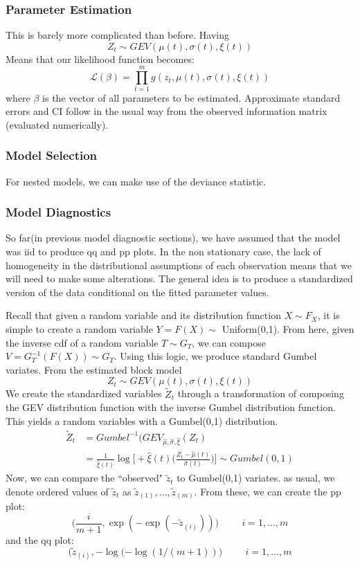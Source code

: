 \documentclass{article}
\theoremstyle{definition}
\theoremstyle{definition}
\begin{document}
\subsubsection{Parameter Estimation}
This is barely more complicated than before. Having 
\[Z_t \sim GEV(\mu(t), \sigma(t), \xi(t))\]
Means that our likelihood function becomes:
\[\mathcal{L}(\beta)= \prod_{t=1}^{m} g(z_t, \mu(t), \sigma(t), \xi(t))\]
where $\beta$ is the vector of all parameters to be
estimated. Approximate standard errors and CI
follow in the usual way from the observed information matrix (evaluated numerically).

\subsubsection{Model Selection}
For nested models, we can make use of the deviance statistic.

\subsubsection{Model Diagnostics}
So far(in previous model diagnostic sections), we have assumed that the model was iid to produce qq and pp plots. In the non stationary case, the lack of homogeneity in the distributional assumptions of each observation means that we will need to make some alterations. The general idea is to produce a standardized version of the data conditional on the fitted parameter values. 

Recall that given a random variable and its distribution function $X\sim F_X$, it is simple to create a random variable $Y=F(X)\sim$ Uniform(0,1). From here, given the inverse cdf of a random variable $T \sim G_T$, we can compose $V=G_T^{-1}(F(X))\sim G_T$. Using this logic, we produce standard Gumbel variates. From the estimated block model  
\[Z_t \sim GEV(\mu(t), \sigma(t), \xi(t))\]
We create the standardized variables $\tilde{Z}_t$ through a transformation of composing the GEV distribution function with the inverse Gumbel distribution function. This yields a random variables with a Gumbel(0,1) distribution.
\begin{align*}
    \tilde{Z}_t&= Gumbel^{-1}(GEV_{\hat\mu,\hat\sigma,\hat\xi}(Z_t)\\
    &= \frac{1}{\hat\xi(t)}\log\bigg[ +\hat\xi(t)\bigg( \frac{Z_t-\hat\mu(t)}{\hat\sigma(t)}\bigg) \bigg]\sim Gumbel(0,1)
\end{align*}
Now, we can compare the ``observed" $\tilde{z}_t$ to Gumbel(0,1) variates. as usual, we denote ordered values of $\tilde{z}_t$ as $\tilde{z}_{(1)},\hdots, \tilde{z}_{(m)}$. From these, we can create the pp plot:
\[\bigg(\frac{i}{m+1},\exp(-\exp(-\tilde{z}_{(i)}))\bigg) \hspace{1cm} i=1,\hdots,m\]
and the qq plot:
\[\bigg(\tilde{z}_{(i)}, -\log(-\log(1/(m+1))\bigg)\hspace{1cm} i=1,\hdots,m\]
\end{document}
